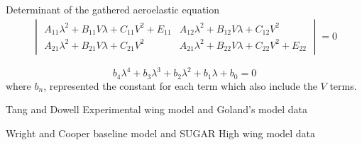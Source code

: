 \documentclass[11pt]{article}
\begin{document}
Determinant of the gathered aeroelastic equation
\begin{equation}\label{eq:determinant}
    \begin{gathered}
    \begin{vmatrix} A_{11}\lambda^2+B_{11}V\lambda+C_{11}V^2+E_{11} & A_{12}\lambda^2+B_{12}V\lambda+C_{12}V^2\\
    A_{21}\lambda^2+B_{21}V\lambda+C_{21}V^2&A_{21}\lambda^2+B_{22}V\lambda+C_{22}V^2+E_{22}\end{vmatrix}=0
    \end{gathered}
\end{equation}

\begin{equation}\label{eq:b_n}
    b_4\lambda^4+b_3\lambda^3+b_2\lambda^2+b_1\lambda+b_0 = 0
\end{equation}
where $b_n$, represented the constant for each term which also include the $V$ terms.

\cleardoublepage
\newpage
{}
\label{app:other-para}
\begin{table}[H]
    \centering
    \caption{Tang and Dowell Experimental wing model\cite{Tang2001ExperimentalWings} and Goland's model \cite{CHETANNICHKAWDE2006NONLINEARCONTINUATION} data}
    
    \label{tab:TandD-exp-wing-data}
\end{table}
\begin{table}[H]
    \centering
    \caption{Wright and Cooper \cite{Wright2015INTRODUCTIONLOADS} baseline model and SUGAR High wing model \cite{Bradley2015SubsonicExploration} data}
    
    \label{tab:Goland-wing-data}
\end{table}
\end{document}

